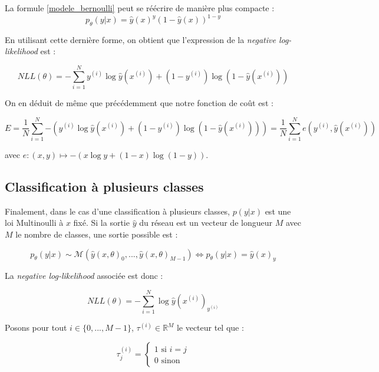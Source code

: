 La formule \ref{modele_bernoulli} peut se réécrire de manière plus compacte :
\begin{equation}
p_{\theta}(y|x) = \hat{y}(x)^y(1-\hat{y}(x))^{1-y}
\label{modele_bernoulli_compact}
\end{equation}

En utilisant cette dernière forme, on obtient que l'expression de la \textit{negative log-likelihood} est : 

\begin{equation}
NLL(\theta) = -\sum_{i=1}^{N}{y^{(i)}\log\hat{y}(x^{(i)})+(1-y^{(i)})\log(1-\hat{y}(x^{(i)}))}
\end{equation}

On en déduit de même que précédemment que notre fonction de coût est :

\begin{equation}
E = \frac{1}{N}\sum_{i=1}^{N}{-(y^{(i)}\log\hat{y}(x^{(i)})+(1-y^{(i)})\log(1-\hat{y}(x^{(i)})))} = \frac{1}{N}\sum_{i=1}^{N}{e(y^{(i)}, \hat{y}(x^{(i)}))}
\end{equation}

avec $e : (x, y) \mapsto -(x \log y + (1-x)\log(1-y))$.

\subsection{Classification à plusieurs classes}

Finalement, dans le cas d'une classification à plusieurs classes, $p(y|x)$ est une loi Multinoulli à $x$ fixé. Si la sortie $\hat{y}$ du réseau est un vecteur de longueur $M$ avec $M$ le nombre de classes, une sortie possible est :

\begin{equation}
p_{\theta}(y|x) \sim \mathcal{M}(\hat{y}(x, \theta)_0, ..., \hat{y}(x, \theta)_{M-1}) \Leftrightarrow p_{\theta}(y|x) = \hat{y}(x)_y
\label{modele_multinoulli}
\end{equation}

La \textit{negative log-likelihood} associée est donc :

\begin{equation}
NLL(\theta) = -\sum_{i=1}^{N}{\log \hat{y}(x^{(i)})_{y^{(i)}}}
\label{NLL_multinoulli}
\end{equation}

Posons pour tout $i \in \{0, ..., M-1\}$, $\tau^{(i)} \in \mathbb{R}^M$ le vecteur tel que :

$$ \tau^{(i)}_j = 
\left\{
    \begin{array}{ll}
        1 \text{ si } i = j \\
        0 \text{ sinon}
    \end{array}
\right.
$$

